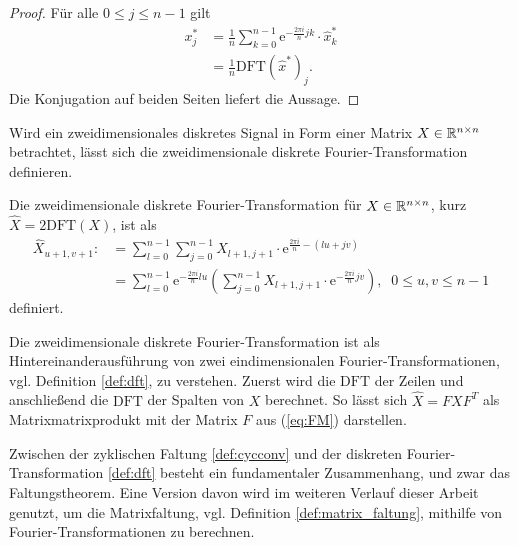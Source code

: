 \begin{proof}
  Für alle $0 \leq j \leq n-1$  gilt
  \begin{align*}
    x_j^{*}&=\frac{1}{n} \sum_{k=0}^{n-1} \mathrm{e}^{-\frac{2 \pi i}{n} j k} \cdot \hat{x}^*_k \\
    &=\frac{1}{n} \mathrm{DFT}(\hat{x}^*)_j.
  \end{align*}
  Die Konjugation auf beiden Seiten liefert die Aussage.
\end{proof}
Wird ein zweidimensionales diskretes Signal in Form einer Matrix $X \in \mathbb{R}^{n \times n}$ betrachtet, lässt sich die zweidimensionale diskrete Fourier-Transformation definieren. 
\begin{defi}
    Die zweidimensionale diskrete Fourier-Transformation für $X \in \mathbb{R}^{n \times n}$, kurz $\hat{X}=2\mathrm{DFT}(X)$, ist als
    \begin{align*}
        \hat{X}_{u+1,v+1}:&= \sum_{l=0}^{n-1} \sum_{j=0}^{n-1} X_{l+1,j+1} \cdot \mathrm{e}^{\frac{2 \pi i}{n} -(lu+jv)} \\
        &=\sum_{l=0}^{n-1} \mathrm{e}^{-\frac{2 \pi i}{n} l u} \left(\sum_{j=0}^{n-1} X_{l+1,j+1} \cdot \mathrm{e}^{-\frac{2 \pi i}{n} j v}\right), \; \; 0 \leq u, v \leq n-1
    \end{align*}
    definiert.
\end{defi}
Die zweidimensionale diskrete Fourier-Transformation ist als Hintereinanderausführung von zwei eindimensionalen Fourier-Transformationen, vgl. Definition \ref{def:dft}, zu verstehen. Zuerst wird die $\mathrm{DFT}$ der Zeilen und anschließend die $\mathrm{DFT}$ der Spalten von $X$ berechnet. So lässt sich $\hat{X}=FXF^T$ als Matrixmatrixprodukt mit der Matrix $F$ aus (\ref{eq:FM}) darstellen.

Zwischen der zyklischen Faltung \ref{def:cycconv} und der diskreten Fourier-Transformation \ref{def:dft} besteht ein fundamentaler Zusammenhang, und zwar das Faltungstheorem. Eine Version davon wird im weiteren Verlauf dieser Arbeit genutzt, um die Matrixfaltung, vgl. Definition \ref{def:matrix_faltung}, mithilfe von Fourier-Transformationen zu berechnen.


